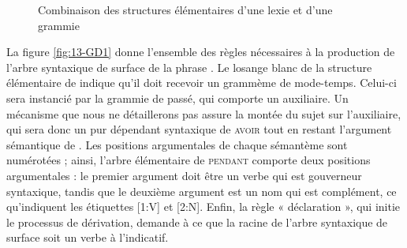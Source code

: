 {\begin{figure}[H]
{}%
\hspace{0.3cm}\hspace{0.3cm}%
\caption{Combinaison des structures élémentaires d’une lexie et d’une grammie\label{fig:13-GD0}}
\end{figure}

La figure \ref{fig:13-GD1} donne l’ensemble des règles nécessaires à la production de l’arbre syntaxique de surface de la phrase . Le losange blanc de la structure élémentaire de  indique qu’il doit recevoir un grammème de mode-temps. Celui-ci sera instancié par la grammie de passé, qui comporte un auxiliaire. Un mécanisme que nous ne détaillerons pas assure la montée du sujet sur l’auxiliaire, qui sera donc un pur dépendant syntaxique de \textsc{avoir} tout en restant l’argument sémantique de . Les positions argumentales de chaque sémantème sont numérotées ; ainsi, l’arbre élémentaire de \textsc{pendant} comporte deux positions argumentales : le premier argument doit être un verbe qui est gouverneur syntaxique, tandis que le deuxième argument est un nom qui est complément, ce qu’indiquent les étiquettes [1:V] et [2:N]. Enfin, la règle « déclaration », qui initie le processus de dérivation, demande à ce que la racine de l’arbre syntaxique de surface soit un verbe à l’indicatif.

}

